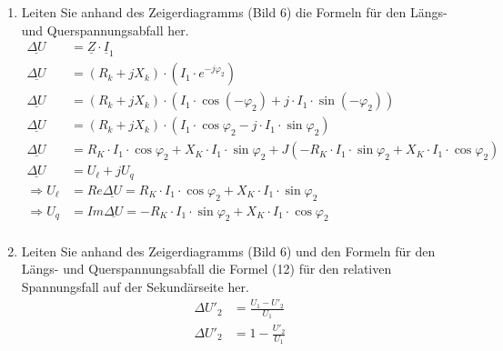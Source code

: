 \begin{enumerate}[label=\alph*)]
	\item Leiten Sie anhand des Zeigerdiagramms (Bild 6) die Formeln für den Längs- und
	      Querspannungsabfall her.
	      \begin{align*}
		      \underline{\Delta U} & = \underline Z\cdot \underline I_1                                                                                                        \\
		      \underline{\Delta U} & = (R_k+ jX_k)\cdot (I_1\cdot e^{-j\varphi_2})                                                                                             \\
		      \underline{\Delta U} & = (R_k+ jX_k)\cdot \left(I_1\cdot\cos(-\varphi_2)+j\cdot I_1\cdot \sin(-\varphi_2)\right)                                                 \\
		      \underline{\Delta U} & = (R_k+ jX_k)\cdot \left(I_1\cdot\cos\varphi_2-j\cdot I_1\cdot \sin\varphi_2\right)                                                       \\
		      \underline{\Delta U} & = R_K\cdot I_1\cdot \cos\varphi_2 + X_K\cdot I_1 \cdot \sin\varphi_2+J(-R_K\cdot I_1 \cdot \sin\varphi_2+X_K\cdot I_1\cdot \cos\varphi_2) \\
		      \underline{\Delta U} & = U_\ell +jU_q                                                                                                                            \\
		      \Rightarrow U_\ell   & =Re{\underline{\Delta U}}=R_K\cdot I_1 \cdot\cos \varphi_2 + X_K \cdot I_1\cdot \sin \varphi_2                                            \\
		      \Rightarrow U_q      & =Im{\underline{\Delta U}}= -R_K\cdot I_1 \cdot\sin \varphi_2 + X_K \cdot I_1\cdot \cos \varphi_2                                          \\
	      \end{align*}
	\item Leiten Sie anhand des Zeigerdiagramms (Bild 6) und den Formeln für den Längs-
	      und Querspannungsabfall die Formel (12) für den relativen Spannungsfall auf der
	      Sekundärseite her.
	      \begin{align*}
		      \Delta U'_2                            & = \frac{U_1 - U'_2}{U_1}                                                                                                \\
		      \Delta U'_2                            & = 1-\frac{U'_2}{U_1}                                                                                                    \\

\end{align*}
\end{enumerate}
